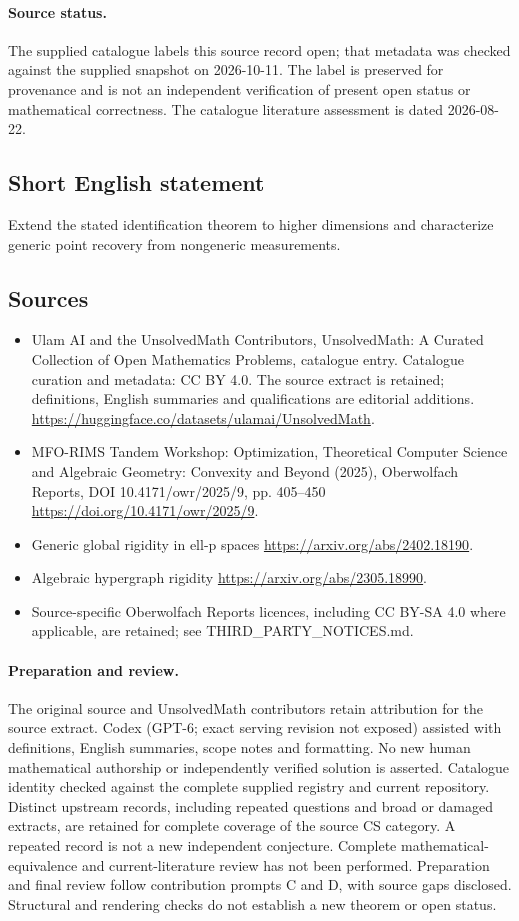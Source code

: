 \documentclass[11pt]{article}
\begin{document}
\paragraph{Source status.}
The supplied catalogue labels this source record open; that metadata was checked against the supplied snapshot on 2026-10-11. The label is preserved for provenance and is not an independent verification of present open status or mathematical correctness. The catalogue literature assessment is dated 2026-08-22.
\subsection{Short English statement}
Extend the stated identification theorem to higher dimensions and characterize generic point recovery from nongeneric measurements.
\subsection{Sources}
\begin{itemize}
\item[S1] Ulam AI and the UnsolvedMath Contributors, UnsolvedMath: A Curated Collection of Open Mathematics Problems, catalogue entry. Catalogue curation and metadata: CC BY 4.0. The source extract is retained; definitions, English summaries and qualifications are editorial additions.
\url{https://huggingface.co/datasets/ulamai/UnsolvedMath}.
\item[S2] MFO-RIMS Tandem Workshop: Optimization, Theoretical Computer Science and Algebraic Geometry: Convexity and Beyond (2025), Oberwolfach Reports, DOI 10.4171/owr/2025/9, pp. 405--450
\url{https://doi.org/10.4171/owr/2025/9}.
\item[S3] Generic global rigidity in ell-p spaces
\url{https://arxiv.org/abs/2402.18190}.
\item[S4] Algebraic hypergraph rigidity
\url{https://arxiv.org/abs/2305.18990}.
\item Source-specific Oberwolfach Reports licences, including CC BY-SA 4.0 where applicable, are retained; see THIRD\_PARTY\_NOTICES.md.
\end{itemize}
\paragraph{Preparation and review.}
The original source and UnsolvedMath contributors retain attribution for the source extract. Codex (GPT-6; exact serving revision not exposed) assisted with definitions, English summaries, scope notes and formatting. No new human mathematical authorship or independently verified solution is asserted. Catalogue identity checked against the complete supplied registry and current repository. Distinct upstream records, including repeated questions and broad or damaged extracts, are retained for complete coverage of the source CS category. A repeated record is not a new independent conjecture. Complete mathematical-equivalence and current-literature review has not been performed. Preparation and final review follow contribution prompts C and D, with source gaps disclosed. Structural and rendering checks do not establish a new theorem or open status.
\label{end:statement}
\end{document}
